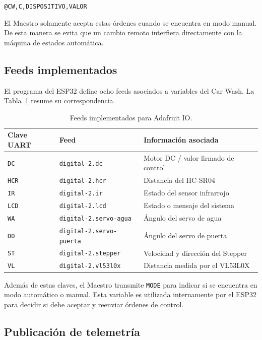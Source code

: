 \begin{center}
\texttt{@CW,C,DISPOSITIVO,VALOR}
\end{center}

El Maestro solamente acepta estas órdenes cuando se encuentra en modo manual. De esta manera se evita que un cambio remoto interfiera directamente con la máquina de estados automática.

\subsection{Feeds implementados}

El programa del ESP32 define ocho feeds asociados a variables del Car Wash. La Tabla~\ref{tab:adafruit_feeds} resume su correspondencia.

\begin{table}[H]
\centering
\caption{Feeds implementados para Adafruit IO.}
\label{tab:adafruit_feeds}
\begin{tabular}{lll}
\toprule
Clave UART & Feed & Información asociada \\
\midrule
\texttt{DC}  & \texttt{digital-2.dc} & Motor DC / valor firmado de control \\
\texttt{HCR} & \texttt{digital-2.hcr} & Distancia del HC-SR04 \\
\texttt{IR}  & \texttt{digital-2.ir} & Estado del sensor infrarrojo \\
\texttt{LCD} & \texttt{digital-2.lcd} & Estado o mensaje del sistema \\
\texttt{WA}  & \texttt{digital-2.servo-agua} & Ángulo del servo de agua \\
\texttt{DO}  & \texttt{digital-2.servo-puerta} & Ángulo del servo de puerta \\
\texttt{ST}  & \texttt{digital-2.stepper} & Velocidad y dirección del Stepper \\
\texttt{VL}  & \texttt{digital-2.vl53l0x} & Distancia medida por el VL53L0X \\
\bottomrule
\end{tabular}
\end{table}

Además de estas claves, el Maestro transmite \texttt{MODE} para indicar si se encuentra en modo automático o manual. Esta variable es utilizada internamente por el ESP32 para decidir si debe aceptar y reenviar órdenes de control.

\subsection{Publicación de telemetría}

